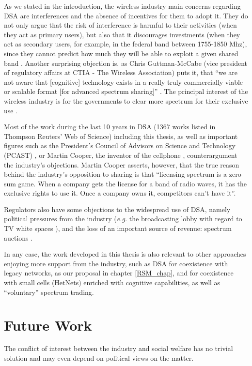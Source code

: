 As we stated in the introduction, the wireless industry main concerns regarding DSA are interferences and the absence of incentives for them to adopt it. They do not only argue that the risk of interference is harmful to their activities (when they act as primary users), but also that it discourages investments (when they act as secondary users, for example, in the federal band between 1755-1850 Mhz), since they cannot predict how much they will be able to exploit a given shared band \cite{CTIA2011}.  Another surprising objection is, as Chris Guttman-McCabe (vice president of regulatory affairs at CTIA - The Wireless Association) puts it, that \enquote{we are not aware that [cognitive] technology exists in a really truly commercially viable or scalable format [for advanced spectrum sharing]} \cite{Chen2012}. The principal interest of the wireless industry is for the governments to clear more spectrum for their exclusive use \cite{Roche2015,Chen2012}. 

Most of the work during the last 10 years in DSA (1367 works listed in Thompson Reuters' Web of Science) including this thesis, as well as important figures such as the President’s Council of Advisors on Science and Technology (PCAST) \cite{AdvisorsonScience}, or Martin Cooper, the inventor of the cellphone \cite{Chen2012b,Br2012}, counterargument the industry's objections. Martin Cooper asserts, however, that the true reason behind the industry's opposition to sharing is that \enquote{licensing spectrum is a zero-sum game. When a company gets the license for a band of radio waves, it has the exclusive rights to use it. Once a company owns it, competitors can't have it}.

Regulators also have some objections to the widespread use of DSA, namely political pressures from the industry (\textit{e.g.} the broadcasting lobby with regard to TV white spaces \cite[p. 103]{Nuechterlein2013}), and the loss of an important source of revenue: spectrum auctions \cite{Baker2015}.

In any case, the work developed in this thesis is also relevant to other  approaches enjoying more support from the industry, such as DSA for coexistence with legacy networks, as our proposal in chapter \ref{RSM_chap}, and for coexistence with small cells (HetNets) enriched with cognitive capabilities, as well as \enquote{voluntary} spectrum trading. 

\section{Future Work}
The conflict of interest between the industry and social welfare has no trivial solution and may even depend on political views on the matter. 

